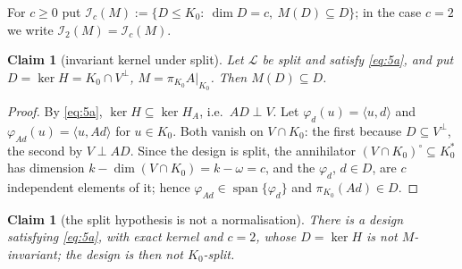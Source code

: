 \documentclass[journal]{IEEEtran}
\theoremstyle{plainn}
\newtheorem{claim}[thm]{Claim}
\theoremstyle{remark}
\begin{document}
For $c\ge0$ put $\mathcal I_c(M):=\{D\le K_0:\ \dim D=c,\ M(D)\subseteq D\}$; in the case $c=2$ we write
$\mathcal I_2(M)=\mathcal I_c(M)$.

\begin{claim}[invariant kernel under split]\label{clm:invariant}
Let $\mathcal L$ be split and satisfy \eqref{eq:5a}, and put $D=\ker H=K_0\cap V^\perp$,
$M=\pi_{K_0}A|_{K_0}$. Then $M(D)\subseteq D$.
\end{claim}

\begin{proof}
By \eqref{eq:5a}, $\ker H\subseteq\ker H_A$, i.e.\ $AD\perp V$. Let $\varphi_d(u)=\langle u,d\rangle$ and
$\varphi_{Ad}(u)=\langle u,Ad\rangle$ for $u\in K_0$. Both vanish on $V\cap K_0$: the first because
$D\subseteq V^\perp$, the second by $V\perp AD$. Since the design is split, the annihilator
$(V\cap K_0)^\circ\subseteq K_0^*$ has dimension $k-\dim(V\cap K_0)=k-\omega=c$, and the $\varphi_d$,
$d\in D$, are $c$ independent elements of it; hence $\varphi_{Ad}\in\operatorname{span}\{\varphi_d\}$ and
$\pi_{K_0}(Ad)\in D$.
\end{proof}

\begin{claim}[the split hypothesis is not a normalisation]\label{clm:notnormal}
There is a design satisfying \eqref{eq:5a}, with exact kernel and $c=2$, whose $D=\ker H$ is not
$M$-invariant; the design is then not $K_0$-split.
\end{claim}
\end{document}

